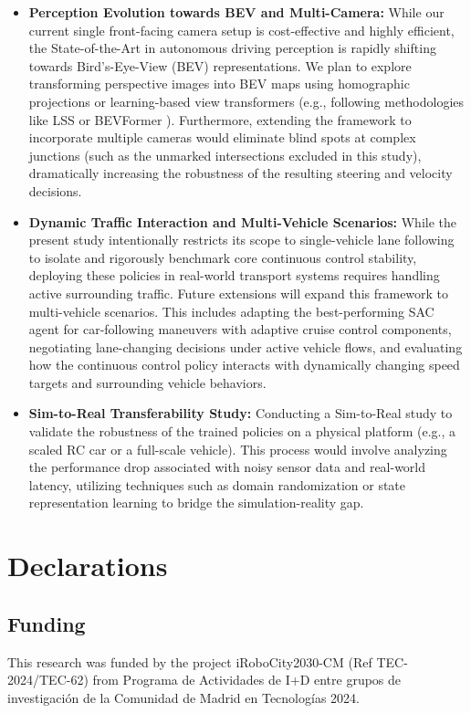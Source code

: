 \documentclass[sn-mathphys,Numbered]{sn-jnl}
\newif\ifanonymous
\begin{document}
\begin{itemize}
    \item \textbf{Perception Evolution towards BEV and Multi-Camera:} While our current single front-facing camera setup is cost-effective and highly efficient, the State-of-the-Art in autonomous driving perception is rapidly shifting towards Bird's-Eye-View (BEV) representations. We plan to explore transforming perspective images into BEV maps using homographic projections or learning-based view transformers (e.g., following methodologies like LSS \citep{philion2020lift} or BEVFormer \citep{li2022bevformer}). Furthermore, extending the framework to incorporate multiple cameras would eliminate blind spots at complex junctions (such as the unmarked intersections excluded in this study), dramatically increasing the robustness of the resulting steering and velocity decisions.
    \item \textbf{Dynamic Traffic Interaction and Multi-Vehicle Scenarios:} While the present study intentionally restricts its scope to single-vehicle lane following to isolate and rigorously benchmark core continuous control stability, deploying these policies in real-world transport systems requires handling active surrounding traffic. Future extensions will expand this framework to multi-vehicle scenarios. This includes adapting the best-performing SAC agent for car-following maneuvers with adaptive cruise control components, negotiating lane-changing decisions under active vehicle flows, and evaluating how the continuous control policy interacts with dynamically changing speed targets and surrounding vehicle behaviors.
    \item \textbf{Sim-to-Real Transferability Study:} Conducting a Sim-to-Real study to validate the robustness of the trained policies on a physical platform (e.g., a scaled RC car or a full-scale vehicle). This process would involve analyzing the performance drop associated with noisy sensor data and real-world latency, utilizing techniques such as domain randomization or state representation learning to bridge the simulation-reality gap.
\end{itemize}

\section*{Declarations}

\subsection*{Funding}
\ifanonymous
This research was funded by [Project Ref Omitted for Double-Blind Review].
\else
This research was funded by the project iRoboCity2030-CM (Ref TEC-2024/TEC-62) from Programa de Actividades de I+D entre grupos de investigación de la Comunidad de Madrid en Tecnologías 2024.
\fi
\end{document}
